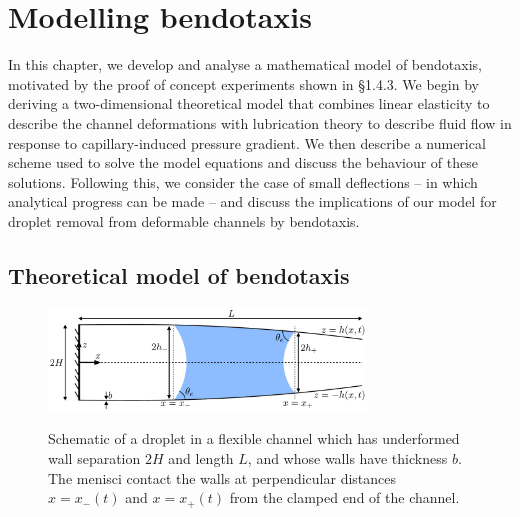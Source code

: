 
\newcommand{\green}[1]{{\color{green} #1}}
\newcommand{\red}[1]{{\color{red} #1}}
\newcommand{\blue}[1]{{\color{blue} #1}}
\newcommand{\bendability}{\nu}

\newcommand{\upd}{\mathrm{d}}
\newcommand{\ddp}[2]{\frac{\partial #1}{\partial #2}}
\newcommand{\dd}[2]{\frac{\upd #1}{\upd #2}}
\newcommand{\xleft}{x_{-}}
\newcommand{\xright}{x_{+}}

\newcommand\abcdeqn[2]{\refstepcounter{equation}
     \[
     \label{#1}
     #2
     \eqno{\text{(\theequation)}\text{a,b,c,d}}
     \]
}
\newcommand\abeqn[2]{\refstepcounter{equation}
     \[
     \label{#1}
     #2
     \eqno{\text{(\theequation)}\text{a,b}}
     \]
}


\graphicspath{{./Sections/Chapter2_modelling/figures/}}


\chapter{Modelling bendotaxis}
In this chapter, we develop and analyse a mathematical model of bendotaxis, motivated by the proof of concept experiments shown in \S1.4.3. We begin by deriving a two-dimensional theoretical model that combines linear elasticity to describe the channel deformations with lubrication theory to describe fluid flow in response to capillary-induced pressure gradient. We then describe a numerical scheme used to solve the model equations and discuss the behaviour of these solutions. Following this, we consider the case of small deflections -- in which analytical progress can be made -- and discuss the implications of our model for droplet removal from deformable channels by bendotaxis.

\section{Theoretical model of bendotaxis}
\begin{figure}[t]
\centering
\includegraphics[width = 0.75\textwidth]{Schematic}
\label{fig:Model:Schematic}
\caption{Schematic of a droplet in a flexible channel which has underformed wall separation $2H$ and length $L$, and whose walls have thickness $b$. The menisci contact the walls at perpendicular distances $x = x_{-}(t)$ and $x = x_{+}(t)$ from the clamped end of the channel.}
\end{figure}

